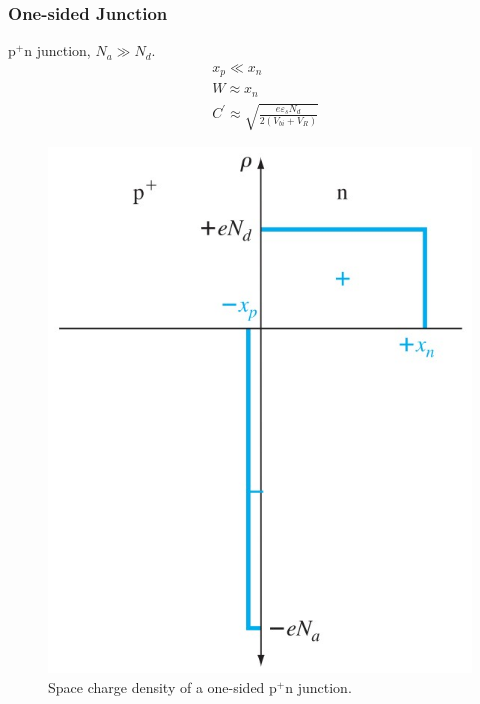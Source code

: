 \documentclass{beamer}
\begin{document}
    \begin{frame} \frametitle{One-sided Junction}
        \begin{minipage}{\linewidth}
            \begin{minipage}{0.5\linewidth}
                \par p$^+$n junction, $N_a \gg N_d$.
                \begin{equation*}
                    \begin{aligned}
                        & x_{p} \ll x_n \\
                        & W \approx x_n \\
                        & C^\prime \approx \sqrt{\frac{e \varepsilon_s N_d}{2 (V_{bi} + V_R)} } 
                    \end{aligned}
                \end{equation*}
            \end{minipage}
            \begin{minipage}{0.4\linewidth}
                \begin{figure}[H]
                    \centering
                    \includegraphics[width=\linewidth]{One-sided-junction.jpg}
                    \caption{Space charge density of a one-sided p$^+$n junction.}
                    \label{fig:One-sided-junction.jpg}
                \end{figure}
            \end{minipage}
        \end{minipage}
    \end{frame}
\end{document}

